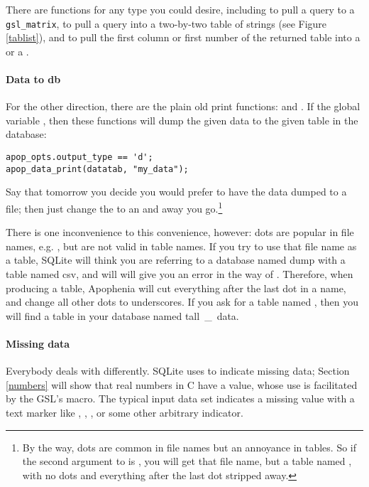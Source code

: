 There are  functions for any type you could desire,
including  to pull a query to a {\tt
gsl\_matrix},  to pull a query into
a two-by-two table of strings (see Figure \ref{tablist}), 
and  to pull the first column or first
number of the returned table into a  or a .

\paragraph{Data to db} For the other direction, there are the plain old
print functions:  and
. If the global variable
, then these functions will dump the
given data to the given table in the database:
\begin{lstlisting}
apop_opts.output_type == 'd';
apop_data_print(datatab, "my_data");
\end{lstlisting}
Say that tomorrow you decide you would prefer to have the data dumped to
a file; then just change the  to an  and away you go.\footnote{By the way, dots are common in file names but an annoyance in tables. So if the second argument to  is , you will get that file name, but a table named , with no dots and everything after the last dot stripped away.}

There is one inconvenience to this convenience, however: dots are popular
in file names, e.g. , but are not valid in table names. If
you try to use that file name as a table, SQLite will think you are
referring to a database named \si{dump} with a table named \si{csv},
and will will give you an error in the way of .
Therefore, when producing a table, Apophenia will cut everything after
the last dot in a name, and change all other dots to underscores. If you
ask for a table named , then you will find a table in
your database named \si{tall\_data}.

\paragraph{Missing data} 
Everybody deals with  differently. SQLite uses 
 to indicate missing data; Section \ref{numbers} will show that
real numbers in C have a  value, whose use is facilitated by
the GSL's  macro. The typical input data set indicates a
missing value with a text marker like , , , or some
other arbitrary indicator.


